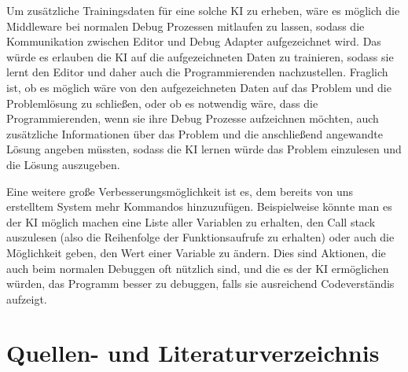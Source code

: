 \documentclass[a4paper,12pt,ngerman]{scrartcl}
\begin{document}
Um zusätzliche Trainingsdaten für eine solche KI zu erheben, wäre es möglich die Middleware bei normalen Debug Prozessen mitlaufen zu lassen, sodass die Kommunikation zwischen Editor und Debug Adapter aufgezeichnet wird. Das würde es erlauben die KI auf die aufgezeichneten Daten zu trainieren, sodass sie lernt den Editor und daher auch die Programmierenden nachzustellen. Fraglich ist, ob es möglich wäre von den aufgezeichneten Daten auf das Problem und die Problemlösung zu schließen, oder ob es notwendig wäre, dass die Programmierenden, wenn sie ihre Debug Prozesse aufzeichnen möchten, auch zusätzliche Informationen über das Problem und die anschließend angewandte Lösung angeben müssten, sodass die KI lernen würde das Problem einzulesen und die Lösung auszugeben.

Eine weitere große Verbesserungsmöglichkeit ist es, dem bereits von uns erstelltem System mehr Kommandos hinzuzufügen. Beispielweise könnte man es der KI möglich machen eine Liste aller Variablen zu erhalten, den Call stack auszulesen (also die Reihenfolge der Funktionsaufrufe zu erhalten) oder auch die Möglichkeit geben, den Wert einer Variable zu ändern. Dies sind Aktionen, die auch beim normalen Debuggen oft nützlich sind, und die es der KI ermöglichen würden, das Programm besser zu debuggen, falls sie ausreichend Codeverständis aufzeigt.

\section{Quellen- und Literaturverzeichnis}
\end{document}
